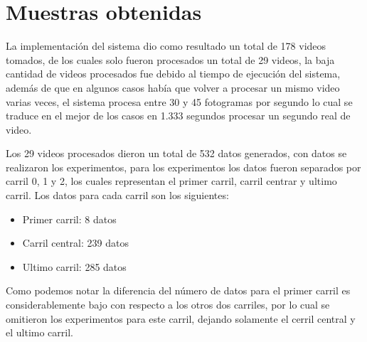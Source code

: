 \section{Muestras obtenidas}

La implementación del sistema dio como resultado un total de 178 videos tomados, de los cuales solo fueron procesados un total de 29 videos, la baja cantidad de videos procesados fue debido al tiempo de ejecución del sistema, además de que en algunos casos había que volver a procesar un mismo video varias veces, el sistema procesa entre 30 y 45 fotogramas por segundo lo cual se traduce en el mejor de los casos en 1.333 segundos procesar un segundo real de video.

Los 29 videos procesados dieron un total de 532 datos generados, con datos se realizaron los experimentos, para los experimentos los datos fueron separados por carril 0, 1 y 2, los cuales representan el primer carril, carril centrar y ultimo carril. Los datos para cada carril son los siguientes:

\begin{itemize}
    \item Primer carril: 8 datos
    \item Carril central: 239 datos
    \item Ultimo carril: 285 datos
\end{itemize}

Como podemos notar la diferencia del número de datos para el primer carril es considerablemente bajo con respecto a los otros dos carriles, por lo cual se omitieron los experimentos para este carril, dejando solamente el cerril central y el ultimo carril.
